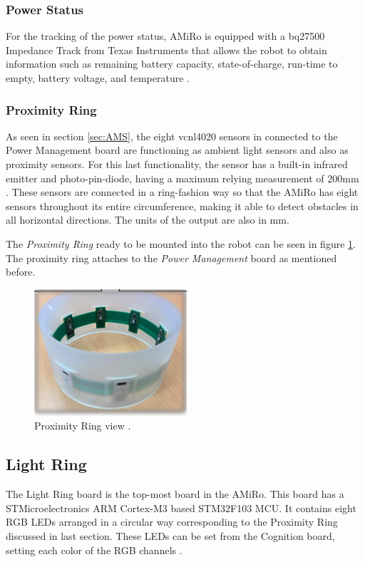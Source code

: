 \documentclass[12pt]{report}%
\begin{document}
\subsubsection{Power Status}
For the tracking of the power status, AMiRo is equipped with a bq27500 Impedance Track from Texas Instruments that allows the robot to obtain information such as remaining battery capacity, state-of-charge, run-time to empty, battery voltage, and temperature \cite{impedancepart}.

\subsubsection{Proximity Ring}
As seen in section \ref{sec:AMS}, the eight vcnl4020 sensors in connected to the Power Management board are functioning as ambient light sensors and also as proximity sensors. For this last functionality, the sensor has a built-in infrared emitter and photo-pin-diode, having a maximum relying measurement of 200mm \cite{proxsensor}. These sensors are connected in a ring-fashion way so that the AMiRo has eight sensors throughout its entire circumference, making it able to detect obstacles in all horizontal directions. The units of the output are also in mm.

The \textit{Proximity Ring} ready to be mounted into the robot can be seen in figure \ref{fig:proxring}. The proximity ring attaches to the \textit{Power Management} board as mentioned before.

\begin{figure}[ht]
	\centering
	\includegraphics[]{prox_ring_real}
    \caption{Proximity Ring view \cite{AMiRo_ppt_v1}.}
    \label{fig:proxring}
\end{figure}
\clearpage

\subsection{Light Ring}
The Light Ring board is the top-most board in the AMiRo. This board has a STMicroelectronics ARM Cortex-M3 based STM32F103 MCU. It contains eight RGB LEDs arranged in a circular way corresponding to the Proximity Ring discussed in last section. These LEDs can be set from the Cognition board, setting each color of the RGB channels \cite{AMiRo_paper_modular}.
\end{document}
